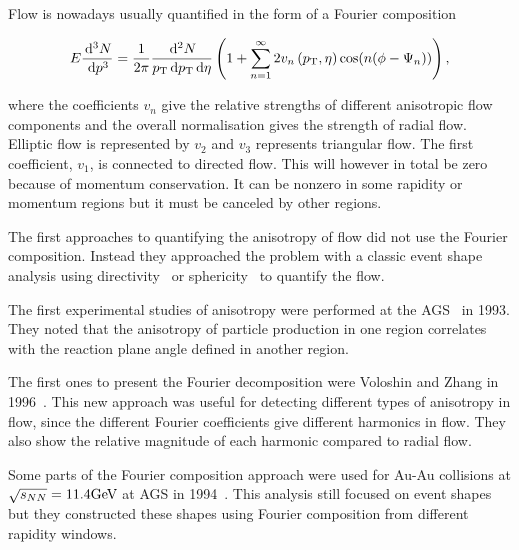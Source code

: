 Flow is nowadays usually quantified in the form of a Fourier composition 

\begin{equation}
E\frac{\,\textrm d{^3N}}{\,\textrm d{p^3}}=\frac{1}{2\pi}\frac{\,\textrm d{^2N}}{p_{\rm T }\,\textrm d{p_{\rm T }}\,\textrm d{\eta} } \left(1+\sum_{n=1}^{\infty}2v_n\left(p_{\rm T},\eta\right)\cos(n(\phi-\Psi_n))\right),
\end{equation}

\noindent where the coefficients $v_n$ give the relative strengths of different anisotropic flow components and the overall normalisation gives the strength of radial flow. Elliptic flow is represented by $v_2$ and $v_3$ represents triangular flow. The first coefficient, $v_1$, is connected to directed flow. This will however in total be zero because of momentum conservation. It can be nonzero in some rapidity or momentum regions but it must be canceled by other regions.

The first approaches to quantifying the anisotropy of flow did not use the Fourier composition. Instead they approached the problem with a classic event shape analysis using directivity~\cite{danielewicz:1985} or sphericity~\cite{Ollitrault:1992, Danielewicz:1983283} to quantify the flow.



The first experimental studies of anisotropy were performed at the AGS~\cite{PhysRevLett.70.1393} in 1993. They noted that the anisotropy of particle production in one region correlates with the reaction plane angle defined in another region. 

The first ones to present the Fourier decomposition were Voloshin and Zhang in 1996~\cite{Voloshin:1994mz}. This new approach was useful for detecting different types of anisotropy in flow, since the different Fourier coefficients give different harmonics in flow. They also show the relative magnitude of each harmonic compared to radial flow.

Some parts of the Fourier composition approach were used for Au-Au collisions at $\sqrt{s_{NN}}=11.4\mathrm{GeV}\kern-0.05em$ at AGS in 1994~\cite{Barrette:1994xr}. This analysis still focused on event shapes but they constructed these shapes using Fourier composition from different rapidity windows.


